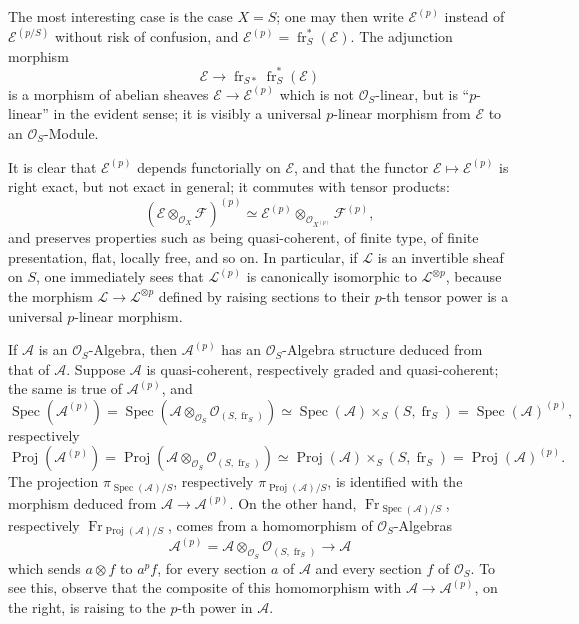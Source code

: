 \documentclass[11pt]{article}
\DeclareMathOperator{\Spec}{Spec}
\providecommand{\OO}{\mathcal{O}}
\providecommand{\cE}{\mathcal E}
\providecommand{\cF}{\mathcal F}
\providecommand{\Spec}{\operatorname{Spec}}
\providecommand{\Spec}{\operatorname{Spec}}
\providecommand{\Spec}{\operatorname{Spec}}
\providecommand{\fr}{\operatorname{fr}}
\providecommand{\Fr}{\operatorname{Fr}}
\providecommand{\Proj}{\operatorname{Proj}}
\providecommand{\cL}{\mathcal L}
\providecommand{\Fr}{\operatorname{Fr}}
\providecommand{\fr}{\operatorname{fr}}
\providecommand{\Spec}{\operatorname{Spec}}
\begin{document}
The most interesting case is the case $X=S$; one may then write $\cE^{(p)}$ instead of $\cE^{(p/S)}$ without risk of confusion, and $\cE^{(p)}=\fr_S^*(\cE)$. The adjunction morphism
\[
\cE\longrightarrow \fr_{S*}\fr_S^*(\cE)
\]
is a morphism of abelian sheaves $\cE\to\cE^{(p)}$ which is not $\OO_S$-linear, but is ``$p$-linear'' in the evident sense; it is visibly a universal $p$-linear morphism from $\cE$ to an $\OO_S$-Module.

It is clear that $\cE^{(p)}$ depends functorially on $\cE$, and that the functor $\cE\mapsto\cE^{(p)}$ is right exact, but not exact in general; it commutes with tensor products:
\[
(\cE\otimes_{\OO_X}\cF)^{(p)}\simeq
\cE^{(p)}\otimes_{\OO_{X^{(p)}}}\cF^{(p)},
\]
and preserves properties such as being quasi-coherent, of finite type, of finite presentation, flat, locally free, and so on. In particular, if $\cL$ is an invertible sheaf on $S$, one immediately sees that $\cL^{(p)}$ is canonically isomorphic to $\cL^{\otimes p}$, because the morphism $\cL\to\cL^{\otimes p}$ defined by raising sections to their $p$-th tensor power is a universal $p$-linear morphism.

If $\mathcal{A}$ is an $\OO_S$-Algebra, then $\mathcal{A}^{(p)}$ has an $\OO_S$-Algebra structure deduced from that of $\mathcal{A}$. Suppose $\mathcal{A}$ is quasi-coherent, respectively graded and quasi-coherent; the same is true of $\mathcal{A}^{(p)}$, and
\[
\Spec(\mathcal{A}^{(p)})=\Spec(\mathcal{A}\otimes_{\OO_S}\OO_{(S,\fr_S)})
 \simeq \Spec(\mathcal{A})\times_S(S,\fr_S)=\Spec(\mathcal{A})^{(p)},
\]
respectively
\[
\Proj(\mathcal{A}^{(p)})=\Proj(\mathcal{A}\otimes_{\OO_S}\OO_{(S,\fr_S)})
 \simeq \Proj(\mathcal{A})\times_S(S,\fr_S)=\Proj(\mathcal{A})^{(p)}.
\]
The projection $\pi_{\Spec(\mathcal{A})/S}$, respectively $\pi_{\Proj(\mathcal{A})/S}$, is identified with the morphism deduced from $\mathcal{A}\to\mathcal{A}^{(p)}$. On the other hand, $\Fr_{\Spec(\mathcal{A})/S}$, respectively $\Fr_{\Proj(\mathcal{A})/S}$, comes from a homomorphism of $\OO_S$-Algebras
\[
\mathcal{A}^{(p)}=\mathcal{A}\otimes_{\OO_S}\OO_{(S,\fr_S)}\longrightarrow \mathcal{A}
\]
which sends $a\otimes f$ to $a^p f$, for every section $a$ of $\mathcal{A}$ and every section $f$ of $\OO_S$. To see this, observe that the composite of this homomorphism with $\mathcal{A}\to\mathcal{A}^{(p)}$, on the right, is raising to the $p$-th power in $\mathcal{A}$.
\end{document}
